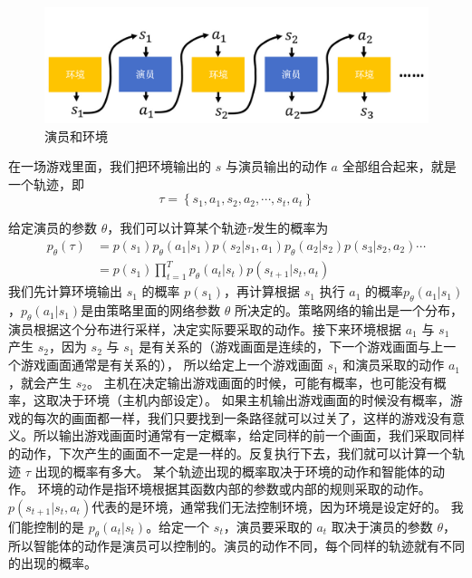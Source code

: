 \begin{figure}[hbt]
    \centering
    \includegraphics[width=0.5\linewidth]{res/ch4/4.5}
    \caption{演员和环境}
    \label{fig:fig4.5}
\end{figure}

在一场游戏里面，我们把环境输出的 $s$ 与演员输出的动作 $a$ 全部组合起来，就是一个轨迹，即
\begin{equation}
    \label{eq:}
    \tau=\left\{s_{1}, a_{1}, s_{2}, a_{2}, \cdots, s_{t}, a_{t}\right\}
\end{equation}

给定演员的参数 $\theta$，我们可以计算某个轨迹$\tau$发生的概率为
\begin{equation}
    \label{eq:}
    \begin{aligned}
        p_{\theta}(\tau)
        &=p\left(s_{1}\right) p_{\theta}\left(a_{1} | s_{1}\right) p\left(s_{2} | s_{1}, a_{1}\right) p_{\theta}\left(a_{2} | s_{2}\right) p\left(s_{3} | s_{2}, a_{2}\right) \cdots \\
        &=p\left(s_{1}\right) \prod_{t=1}^{T} p_{\theta}\left(a_{t} | s_{t}\right) p\left(s_{t+1} | s_{t}, a_{t}\right)
        \end{aligned}
\end{equation}
我们先计算环境输出 $s_1$ 的概率 $p(s_1)$，再计算根据 $s_1$ 执行 $a_1$ 的概率$p_{\theta}\left(a_{1} | s_{1}\right)$
，$p_{\theta}\left(a_{1} | s_{1}\right)$是由策略里面的网络参数 $\theta$ 所决定的。策略网络的输出是一个分布，演员根据这个分布进行采样，决定实际要采取的动作。接下来环境根据 $a_1$ 与 $s_1$ 产生 $s_2$，因为 $s_2$ 与 $s_1$ 是有关系的（游戏画面是连续的，下一个游戏画面与上一个游戏画面通常是有关系的），
所以给定上一个游戏画面 $s_1$ 和演员采取的动作 $a_1$，就会产生 $s_2$。
主机在决定输出游戏画面的时候，可能有概率，也可能没有概率，这取决于环境（主机内部设定）。
如果主机输出游戏画面的时候没有概率，游戏的每次的画面都一样，我们只要找到一条路径就可以过关了，这样的游戏没有意义。所以输出游戏画面时通常有一定概率，给定同样的前一个画面，我们采取同样的动作，下次产生的画面不一定是一样的。反复执行下去，我们就可以计算一个轨迹 
$\tau$
出现的概率有多大。
某个轨迹出现的概率取决于环境的动作和智能体的动作。
环境的动作是指环境根据其函数内部的参数或内部的规则采取的动作。
$p(s_{t+1}|s_t,a_t)$代表的是环境，通常我们无法控制环境，因为环境是设定好的。
我们能控制的是 $p_\theta(a_t|s_t)$。给定一个 $s_t$，演员要采取的 $a_t$ 取决于演员的参数 $\theta$， 所以智能体的动作是演员可以控制的。演员的动作不同，每个同样的轨迹就有不同的出现的概率。

